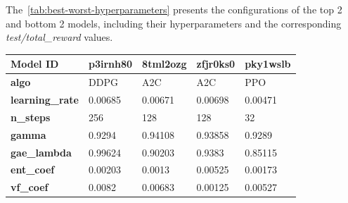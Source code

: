 \documentclass[../xlapes02]{subfiles}
\begin{document}
    The~\cref{tab:best-worst-hyperparameters} presents the configurations of the top 2 and bottom 2 models, including their hyperparameters and the corresponding \emph{test/total\_reward} values.

    \begin{table}[H]
        \centering
        {\footnotesize
            \begin{tabular}{|l||l|l||l|l|}
                \hline
                \textbf{Model ID}                  & p3irnh80                                     & 8tml2ozg                                     & zfjr0ks0                                     & pky1wslb                                     \\ \hline
                \textbf{algo}                      & DDPG                                         & A2C                                          & A2C                                          & PPO                                          \\ \hline
                \textbf{learning\_rate}            & 0.00685                                      & 0.00671                                      & 0.00698                                      & 0.00471                                      \\ \hline
                \textbf{n\_steps}                  & 256                                          & 128                                          & 128                                          & 32                                           \\ \hline
                \textbf{gamma}                     & 0.9294                                       & 0.94108                                      & 0.93858                                      & 0.9289                                       \\ \hline
                \textbf{gae\_lambda}               & 0.99624                                      & 0.90203                                      & 0.9383                                       & 0.85115                                      \\ \hline
                \textbf{ent\_coef}                 & 0.00203                                      & 0.0013                                       & 0.00525                                      & 0.00173                                      \\ \hline
                \textbf{vf\_coef}                  & 0.0082                                       & 0.00683                                      & 0.00125                                      & 0.00527                                      \\ \hline

\end{tabular}}
\end{table}
\end{document}
